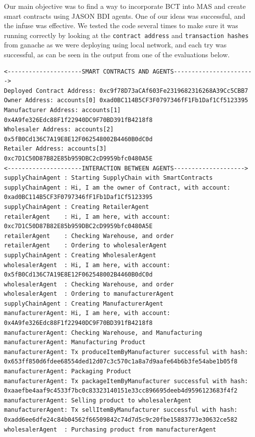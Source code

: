 Our main objective was to find a way to incorporate \ac{BCT} into \ac{MAS} and create smart contracts using JASON \ac{BDI} agents. One of our ideas was successful, and the infuse was effective. We tested the code several times to make sure it was running correctly by looking at the \texttt{contract address} and \texttt{transaction hashes} from ganache as we were deploying using local network, and each try was successful, as can be seen in the output from one of the evaluations below.

\vspace{.5cm}

\begin{lstlisting}[numbers=none, basicstyle=\ttfamily\tiny]
<---------------------SMART CONTRACTS AND AGENTS----------------------->
Deployed Contract Address: 0xc9f78D73aCAf603Fe2319682316268A39Cc5CBB7
Owner Address: accounts[0] 0xad0BC114B5CF3F0797346fF1Fb1Daf1Cf5123395
Manufacturer Address: accounts[1] 0x4A9fe326Edc88F1f22940DC9F70BD391fB4218f8
Wholesaler Address: accounts[2] 0x5fB0Cd136C7A19E8E12F062548002B4460B0dC0d
Retailer Address: accounts[3] 0xc7D1C50D87B82E85b959DBC2cD9959bfc0480A5E
<---------------------INTERACTION BETWEEN AGENTS-------------------->
supplyChainAgent : Starting SupplyChain with SmartContracts
supplyChainAgent : Hi, I am the owner of Contract, with account: 0xad0BC114B5CF3F0797346fF1Fb1Daf1Cf5123395
supplyChainAgent : Creating RetailerAgent
retailerAgent    : Hi, I am here, with account: 0xc7D1C50D87B82E85b959DBC2cD9959bfc0480A5E
retailerAgent    : Checking Warehouse, and order
retailerAgent    : Ordering to wholesalerAgent
supplyChainAgent : Creating WholesalerAgent
wholesalerAgent  : Hi, I am here, with account: 0x5fB0Cd136C7A19E8E12F062548002B4460B0dC0d
wholesalerAgent  : Checking Warehouse, and order
wholesalerAgent  : Ordering to manufacturerAgent
supplyChainAgent : Creating ManufacturerAgent
manufacturerAgent: Hi, I am here, with account: 0x4A9fe326Edc88F1f22940DC9F70BD391fB4218f8
manufacturerAgent: Checking Warehouse, and Manufacturing
manufacturerAgent: Manufacturing Product
manufacturerAgent: Tx produceItemByManufacturer successful with hash: 0x653ff850d6fdee68554ded12d07c3c570c1a8a7d9aafe64b6b3fe54abe1b05f8
manufacturerAgent: Packaging Product
manufacturerAgent: Tx packageItemByManufacturer successful with hash: 0xaaefbe4aaf9c4533f7bc0c83323140151e33cc896695deeb4d9596123683f4f2
manufacturerAgent: Selling product to wholesalerAgent
manufacturerAgent: Tx sellItemByManufacturer successful with hash: 0xadd6ee6dfe24c84b04562f66509842c74d7d5c9c20fbe15883773e30632ce582
wholesalerAgent  : Purchasing product from manufacturerAgent

\end{lstlisting}
